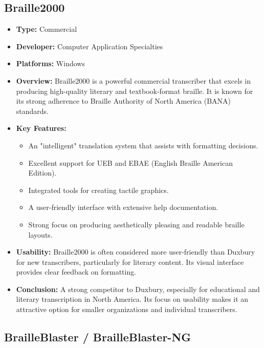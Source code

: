 \subsection{Braille2000}
\label{sub:braille2000}

\begin{itemize}
	\item \textbf{Type:} Commercial
	\item \textbf{Developer:} Computer Application Specialties
	\item \textbf{Platforms:} Windows
	\item \textbf{Overview:} Braille2000 \supercite{Braille2000} is a powerful commercial transcriber that excels in producing high-quality literary and textbook-format braille. It is known for its strong adherence to Braille Authority of North America (BANA) standards.
	\item \textbf{Key Features:}
	      \begin{itemize}
		      \item An "intelligent" translation system that assists with formatting decisions.
		      \item Excellent support for UEB and EBAE (English Braille American Edition).
		      \item Integrated tools for creating tactile graphics.
		      \item A user-friendly interface with extensive help documentation.
		      \item Strong focus on producing aesthetically pleasing and readable braille layouts.
	      \end{itemize}
	\item \textbf{Usability:} Braille2000 is often considered more user-friendly than Duxbury for new transcribers, particularly for literary content. Its visual interface provides clear feedback on formatting.
	\item \textbf{Conclusion:} A strong competitor to Duxbury, especially for educational and literary transcription in North America. Its focus on usability makes it an attractive option for smaller organizations and individual transcribers.
\end{itemize}

\subsection{BrailleBlaster / BrailleBlaster-NG}
\label{sub:brailleblaster-brailleblaster-ng}

